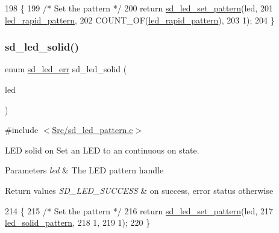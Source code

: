 \begin{DoxyCode}
198 \{
199     \textcolor{comment}{/* Set the pattern */}
200     \textcolor{keywordflow}{return} \mbox{\hyperlink{group___s_d___l_e_d___functions_ga5641c6ed41cf81ecbd2d61731a412667}{sd\_led\_set\_pattern}}(led,
201                 \mbox{\hyperlink{group___s_d___l_e_d___pattern___definitions_gaaf958cbda7044776ff2c95480a8a7255}{led\_rapid\_pattern}},
202                 COUNT\_OF(\mbox{\hyperlink{group___s_d___l_e_d___pattern___definitions_gaaf958cbda7044776ff2c95480a8a7255}{led\_rapid\_pattern}}),
203                 1);
204 \}        
\end{DoxyCode}
\mbox{\label{group___s_d___l_e_d___pattern___functions_gac9aad35d0bb89acc8f47b9be781059c8}} 
\subsubsection{\texorpdfstring{sd\+\_\+led\+\_\+solid()}{sd\_led\_solid()}}
{\footnotesize\ttfamily enum \mbox{\hyperlink{group___s_d___l_e_d___types_ga4f347a1003b4089de88a7f0fc62c1071}{sd\+\_\+led\+\_\+err}} sd\+\_\+led\+\_\+solid (\begin{DoxyParamCaption}\item[{struct \mbox{\hyperlink{structsd__led}{sd\+\_\+led}} $\ast$}]{led }\end{DoxyParamCaption})}



{\ttfamily \#include $<$\mbox{\hyperlink{sd__led__pattern_8c}{Src/sd\+\_\+led\+\_\+pattern.\+c}}$>$}



L\+ED solid on Set an L\+ED to an continuous on state. 


\begin{DoxyParams}{Parameters}
{\em led} & The L\+ED pattern handle \\
\hline
\end{DoxyParams}

\begin{DoxyRetVals}{Return values}
{\em S\+D\+\_\+\+L\+E\+D\+\_\+\+S\+U\+C\+C\+E\+SS} & on success, error status otherwise \\
\hline
\end{DoxyRetVals}

\begin{DoxyCode}
214 \{
215     \textcolor{comment}{/* Set the pattern */}
216     \textcolor{keywordflow}{return} \mbox{\hyperlink{group___s_d___l_e_d___functions_ga5641c6ed41cf81ecbd2d61731a412667}{sd\_led\_set\_pattern}}(led,
217                 \mbox{\hyperlink{group___s_d___l_e_d___pattern___definitions_ga9220a191a8d408610b6c32eb3ccdc11e}{led\_solid\_pattern}}, 
218                 1, 
219                 1);
220 \}
\end{DoxyCode}
